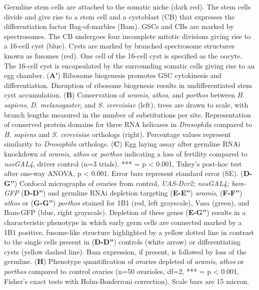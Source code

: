 \documentclass[12pt,oneside]{reedthesis}
\begin{document}
Germline stem cells are attached to the somatic niche (dark red). The
stem cells divide and give rise to a stem cell and a cystoblast (CB)
that expresses the differentiation factor Bag-of-marbles (Bam). GSCs and
CBs are marked by spectrosomes. The CB undergoes four incomplete mitotic
divisions giving rise to a 16-cell cyst (blue). Cysts are marked by
branched spectrosome structures known as fusomes (red). One cell of the
16-cell cyst is specified as the oocyte. The 16-cell cyst is
encapsulated by the surrounding somatic cells giving rise to an egg
chamber. (\textbf{A'}) Ribosome biogenesis promotes GSC cytokinesis and
differentiation. Disruption of ribosome biogenesis results in
undifferentiated stem cyst accumulation. (\textbf{B}) Conservation of
\emph{aramis}, \emph{athos}, and \emph{porthos} between \emph{H. sapiens}, \emph{D.
melanogaster}, and \emph{S. cerevisiae} (left), trees are drawn to scale,
with branch lengths measured in the number of substitutions per site.
Representation of conserved protein domains for three RNA helicases in
\emph{Drosophila} compared to \emph{H. sapiens} and \emph{S. cerevisiae} orthologs
(right). Percentage values represent similarity to \emph{Drosophila}
orthologs. (\textbf{C}) Egg laying assay after germline RNAi knockdown of
\emph{aramis}, \emph{athos} or \emph{porthos} indicating a loss of fertility compared
to \emph{nosGAL4}, driver control (n=3 trials). *** = p \textless{} 0.001, Tukey's
post-hoc test after one-way ANOVA, p \textless{} 0.001. Error bars represent
standard error (SE). (\textbf{D-G''}) Confocal micrographs of ovaries from
control, \emph{UAS-Dcr2; nosGAL4; bam-GFP} (\textbf{D-D''}) and germline RNAi
depletion targeting (\textbf{E-E''}) \emph{aramis}, (\textbf{F-F''}) \emph{athos} or
(\textbf{G-G''}) \emph{porthos} stained for 1B1 (red, left grayscale), Vasa
(green), and Bam-GFP (blue, right grayscale). Depletion of these genes
(\textbf{E-G''}) results in a characteristic phenotype in which early germ
cells are connected marked by a 1B1 positive, fusome-like structure
highlighted by a yellow dotted line in contrast to the single cells
present in (\textbf{D-D''}) controls (white arrow) or differentiating cysts
(yellow dashed line). Bam expression, if present, is followed by loss of
the germline. (\textbf{H}) Phenotype quantification of ovaries depleted of
\emph{aramis}, \emph{athos} or \emph{porthos} compared to control ovaries (n=50
ovarioles, df=2, *** = p \textless{} 0.001, Fisher's exact tests with
Holm-Bonferroni correction). Scale bars are 15 micron.

\textbf{\hfill\break
}
\end{document}
